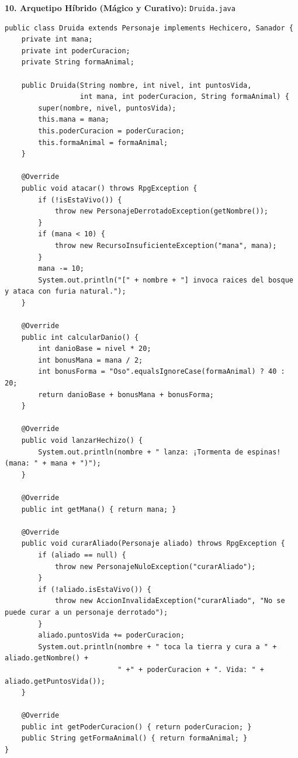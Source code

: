 \documentclass[11pt,letterpaper]{article}
\begin{document}
\textbf{10. Arquetipo Híbrido (Mágico y Curativo):} \texttt{Druida.java}
\begin{lstlisting}[style=JavaStyle]
public class Druida extends Personaje implements Hechicero, Sanador {
    private int mana;
    private int poderCuracion;
    private String formaAnimal;

    public Druida(String nombre, int nivel, int puntosVida,
                  int mana, int poderCuracion, String formaAnimal) {
        super(nombre, nivel, puntosVida);
        this.mana = mana;
        this.poderCuracion = poderCuracion;
        this.formaAnimal = formaAnimal;
    }

    @Override
    public void atacar() throws RpgException {
        if (!isEstaVivo()) {
            throw new PersonajeDerrotadoException(getNombre());
        }
        if (mana < 10) {
            throw new RecursoInsuficienteException("mana", mana);
        }
        mana -= 10;
        System.out.println("[" + nombre + "] invoca raices del bosque y ataca con furia natural.");
    }

    @Override
    public int calcularDanio() {
        int danioBase = nivel * 20;
        int bonusMana = mana / 2;
        int bonusForma = "Oso".equalsIgnoreCase(formaAnimal) ? 40 : 20;
        return danioBase + bonusMana + bonusForma;
    }

    @Override
    public void lanzarHechizo() {
        System.out.println(nombre + " lanza: ¡Tormenta de espinas! (mana: " + mana + ")");
    }

    @Override
    public int getMana() { return mana; }

    @Override
    public void curarAliado(Personaje aliado) throws RpgException {
        if (aliado == null) {
            throw new PersonajeNuloException("curarAliado");
        }
        if (!aliado.isEstaVivo()) {
            throw new AccionInvalidaException("curarAliado", "No se puede curar a un personaje derrotado");
        }
        aliado.puntosVida += poderCuracion;
        System.out.println(nombre + " toca la tierra y cura a " + aliado.getNombre() +
                           " +" + poderCuracion + ". Vida: " + aliado.getPuntosVida());
    }

    @Override
    public int getPoderCuracion() { return poderCuracion; }
    public String getFormaAnimal() { return formaAnimal; }
}
\end{lstlisting}
\end{document}
